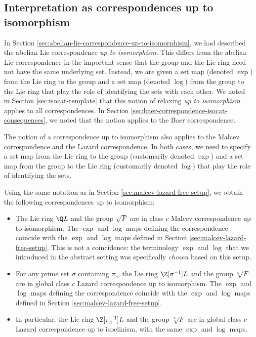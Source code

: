 \documentclass{ucetd}
\begin{document}
\subsection{Interpretation as correspondences up to isomorphism}\label{sec:malcev-lazard-correspondence-interpretation}

In Section \ref{sec:abelian-lie-correspondence-up-to-isomorphism}, we
had described the abelian Lie correspondence {\em up to
  isomorphism}. This differs from the abelian Lie correspondence in
the important sense that the group and the Lie ring need not have the
same underlying set. Instead, we are given a set map (denoted $\exp$)
from the Lie ring to the group and a set map (denoted $\log$) from the
group to the Lie ring that play the role of identifying the sets with
each other. We noted in Section \ref{sec:isocat-template} that this
notion of relaxing {\em up to isomorphism} applies to all
correspondences. In Section
\ref{sec:baer-correspondence-isocat-consequences}, we noted that the
notion applies to the Baer correspondence.

The notion of a correspondence up to isomorphism also applies to the
Malcev correspondence and the Lazard correspondence. In both cases, we
need to specify a set map from the Lie ring to the group (customarily
denoted $\exp$) and a set map from the group to the Lie ring
(customarily denoted $\log$) that play the role of identifying the sets.

Using the same notation as in Section
\ref{sec:malcev-lazard-free-setup}, we obtain the following
correspondences up to isomorphism:

\begin{itemize}
\item The Lie ring $\Q L$ and the group $\sqrt{F}$ are in class $c$
  Malcev correspondence up to isomorphism. The $\exp$ and $\log$ maps
  defining the correspondence coincide with the $\exp$ and $\log$ maps
  defined in Section \ref{sec:malcev-lazard-free-setup}. This is not a
  coincidence: the terminology $\exp$ and $\log$ that we introduced in
  the abstract setting was specifically {\em chosen} based on this
  setup.
\item For any prime set $\sigma$ containing $\pi_c$, the Lie ring
  $\Z[\sigma^{-1}]L$ and the group $\sqrt[\sigma]{F}$ are in global
  class $c$ Lazard correspondence up to isomorphism. The $\exp$ and
  $\log$ maps defining the correspondence coincide with the $\exp$ and
  $\log$ maps defined in Section \ref{sec:malcev-lazard-free-setup}.
\item In particular, the Lie ring $\Z[\pi_c^{-1}]L$ and the group
  $\sqrt[\pi_c]{F}$ are in global class $c$ Lazard correspondence up to
  isoclinism, with the same $\exp$ and $\log$ maps.
\end{itemize}
\end{document}
